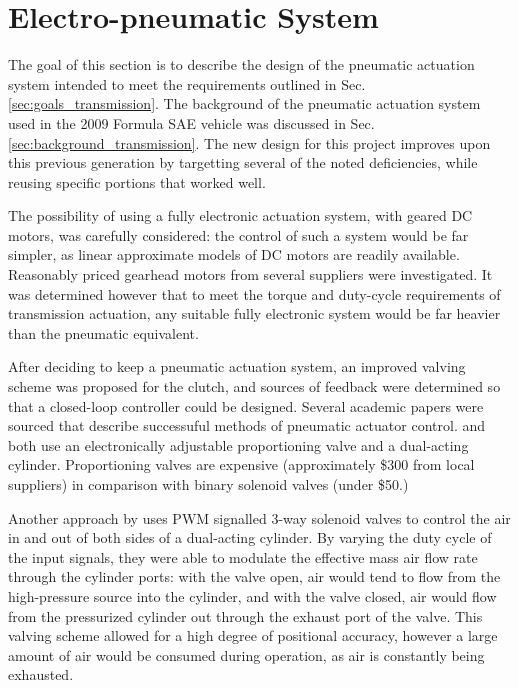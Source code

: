 \section{Electro-pneumatic System}

The goal of this section is to describe the design of the pneumatic actuation system intended to meet the requirements outlined in Sec. \ref{sec:goals_transmission}. The background of the pneumatic actuation system used in the 2009 Formula SAE vehicle was discussed in Sec. \ref{sec:background_transmission}. The new design for this project improves upon this previous generation by targetting several of the noted deficiencies, while reusing specific portions that worked well.

The possibility of using a fully electronic actuation system, with geared DC motors, was carefully considered: the control of such a system would be far simpler, as linear approximate models of DC motors are readily available. Reasonably priced gearhead motors from several suppliers were investigated. It was determined however that to meet the torque and duty-cycle requirements of transmission actuation, any suitable fully electronic system would be far heavier than the pneumatic equivalent.

After deciding to keep a pneumatic actuation system, an improved valving scheme was proposed for the clutch, and sources of feedback were determined so that a closed-loop controller could be designed. Several academic papers were sourced that describe successuful methods of pneumatic actuator control.  and \citet{adaptive_pneumatic} both use an electronically adjustable proportioning valve and a dual-acting cylinder. Proportioning valves are expensive (approximately \$300 from local suppliers) in comparison with binary solenoid valves (under \$50.)

Another approach by \citet{accurate_position} uses PWM signalled 3-way solenoid valves to control the air in and out of both sides of a dual-acting cylinder. By varying the duty cycle of the input signals, they were able to modulate the effective mass air flow rate through the cylinder ports: with the valve open, air would tend to flow from the high-pressure source into the cylinder, and with the valve closed, air would flow from the pressurized cylinder out through the exhaust port of the valve. This valving scheme allowed for a high degree of positional accuracy, however a large amount of air would be consumed during operation, as air is constantly being exhausted.


